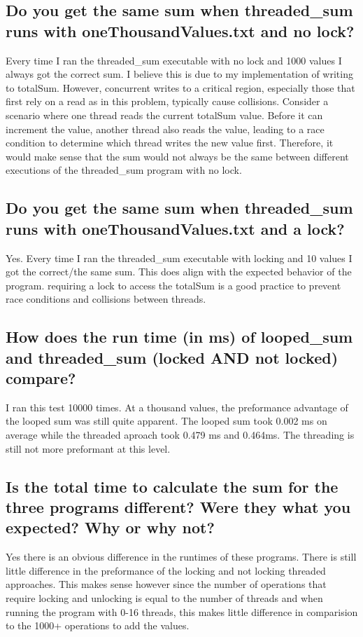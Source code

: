 \documentclass{assignment-x}
\begin{document}
\subsection{Do you get the same sum when threaded\_sum runs with oneThousandValues.txt and no lock?}
Every time I ran the threaded\_sum executable with no lock and 1000 values I always got the correct sum. I believe this is due to my implementation of writing to totalSum. However, concurrent writes to a critical region, especially those that first rely on a read as in this problem, typically cause collisions.  Consider a scenario where one thread reads the current totalSum value. Before it can increment the value, another thread also reads the value, leading to a race condition to determine which thread writes the new value first. Therefore, it would make sense that the sum would not always be the same between different executions of the threaded\_sum program with no lock.

\subsection{Do you get the same sum when threaded\_sum runs with oneThousandValues.txt and a lock?}
Yes. Every time I ran the threaded\_sum executable with locking and 10 values I got the correct/the same sum. This does align with the expected behavior of the program. requiring a lock to access the totalSum is a good practice to prevent race conditions and collisions between threads.

\subsection{How does the run time (in ms) of looped\_sum and threaded\_sum (locked AND not locked) compare?}
I ran this test 10000 times. At a thousand values, the preformance advantage of the looped sum was still quite apparent. The looped sum took 0.002 ms on average while the threaded aproach took 0.479 ms and 0.464ms. The threading is still not more preformant at this level.
\subsection{Is the total time to calculate the sum for the three programs different? Were they what you expected? Why or why not?}
Yes there is an obvious difference in the runtimes of these programs. There is still little difference in the preformance of the locking and not locking threaded approaches. This makes sense however since the number of operations that require locking and unlocking is equal to the number of threads and when running the program with 0-16 threads, this makes little difference in comparision to the 1000+ operations to add the values.
\end{document}
